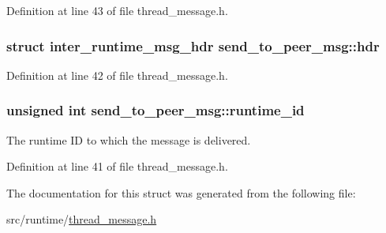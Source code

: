 Definition at line 43 of file thread\-\_\-message.\-h.

\hypertarget{structsend__to__peer__msg_a5e233e774179fa4a3dbe2706c0c9955f}{
\subsubsection[{hdr}]{\setlength{\rightskip}{0pt plus 5cm}struct {\bf inter\-\_\-runtime\-\_\-msg\-\_\-hdr} send\-\_\-to\-\_\-peer\-\_\-msg\-::hdr}}\label{structsend__to__peer__msg_a5e233e774179fa4a3dbe2706c0c9955f}


Definition at line 42 of file thread\-\_\-message.\-h.

\hypertarget{structsend__to__peer__msg_a291ea22d7a3784c77f7df0c78e06b84a}{
\subsubsection[{runtime\-\_\-id}]{\setlength{\rightskip}{0pt plus 5cm}unsigned int send\-\_\-to\-\_\-peer\-\_\-msg\-::runtime\-\_\-id}}\label{structsend__to__peer__msg_a291ea22d7a3784c77f7df0c78e06b84a}


The runtime I\-D to which the message is delivered. 



Definition at line 41 of file thread\-\_\-message.\-h.



The documentation for this struct was generated from the following file\-:\begin{DoxyCompactItemize}
\item 
src/runtime/\hyperlink{thread__message_8h}{thread\-\_\-message.\-h}\end{DoxyCompactItemize}
